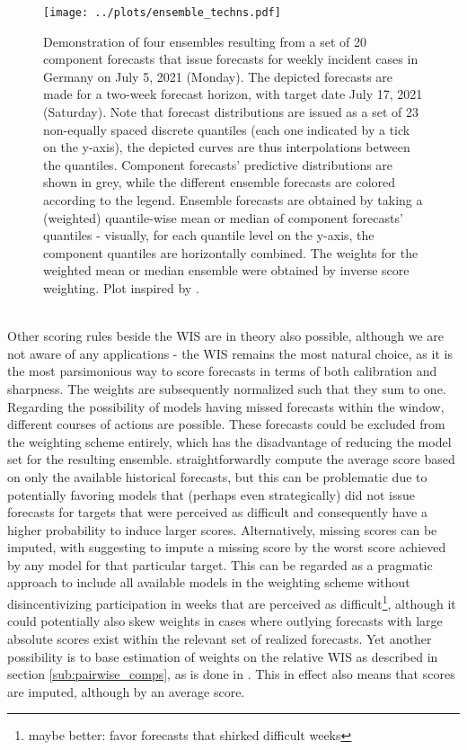 \begin{figure}
\texttt{[image: ../plots/ensemble\_techns.pdf]}
\caption{Demonstration of four ensembles resulting from a set of 20 component forecasts that issue forecasts for weekly incident cases in Germany on July 5, 2021 (Monday). The depicted forecasts are made for a two-week forecast horizon, with target date July 17, 2021 (Saturday). Note that forecast distributions are issued as a set of 23 non-equally spaced discrete quantiles (each one indicated by a tick on the y-axis), the depicted curves are thus interpolations between the quantiles. Component forecasts' predictive distributions are shown in grey, while the different ensemble forecasts are colored according to the legend. Ensemble forecasts are obtained by taking a (weighted) quantile-wise mean or median of component forecasts' quantiles - visually, for each quantile level on the y-axis, the component quantiles are horizontally combined. The weights for the weighted mean or median ensemble were obtained by inverse score weighting. Plot inspired by \cite{taylor_combining_2021}.}
\label{fig:ensemble_techs}
\end{figure}\\
Other scoring rules beside the WIS are in theory also possible, although we are not aware of any applications - the WIS remains the most natural choice, as it is the most parsimonious way to score forecasts in terms of both calibration and sharpness. The weights are subsequently normalized such that they sum to one. Regarding the possibility of models having missed forecasts within the window, different courses of actions are possible. These forecasts could be excluded from the weighting scheme entirely, which has the disadvantage of reducing the model set for the resulting ensemble. \cite{taylor_combining_2021} straightforwardly compute the average score based on only the available historical forecasts, but this can be problematic due to potentially favoring models that (perhaps even strategically) did not issue forecasts for targets that were perceived as difficult and consequently have a higher probability to induce larger scores. Alternatively, missing scores can be imputed, with \cite{bracher_national_2021} suggesting to impute a missing score by the worst score achieved by any model for that particular target. This can be regarded as a pragmatic approach to include all available models in the weighting scheme without disincentivizing participation in weeks that are perceived as difficult\footnote{maybe better: favor forecasts that shirked difficult weeks}, although it could potentially also skew weights in cases where outlying forecasts with large absolute scores exist within the relevant set of realized forecasts. Yet another possibility is to base estimation of weights on the relative WIS as described in section \ref{sub:pairwise_comps}, as is done in \cite{ray_comparing_2022}. This in effect also means that scores are imputed, although by an average score.\\
